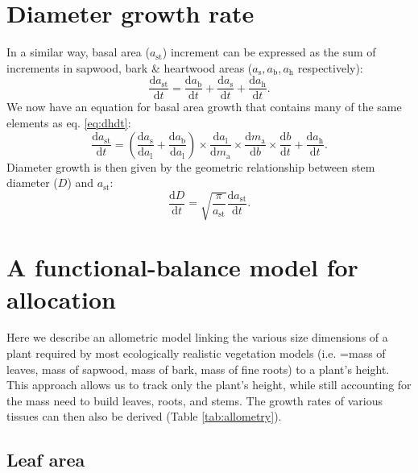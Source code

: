 \documentclass[10pt,twoside]{article}
\begin{document}
\section{Diameter growth rate}

In a similar way, basal area ($a_\textrm{st}$) increment can be
expressed as the sum of increments in sapwood, bark \& heartwood areas
($a_\textrm{s}, a_\textrm{b}, a_\textrm{h}$ respectively):
$$\frac{\textrm{d}a_\textrm{st}}{\textrm{d}t}= \frac{\textrm{d}a_\textrm{b}}{\textrm{d}t} + \frac{\textrm{d}a_\textrm{s}}{\textrm{d}t} + \frac{\textrm{d}a_\textrm{h}}{\textrm{d}t}.$$
We now have an equation for basal area growth that contains many of the same
elements as eq. \ref{eq:dhdt}:
\begin{equation}\label{eq:dast}
\frac{\textrm{d}a_\textrm{st}}{\textrm{d}t}=
\left(\frac{\textrm{d}a_\textrm{s}}{\textrm{d}a_\textrm{l}} + \frac{\textrm{d}a_\textrm{b}}{\textrm{d}a_\textrm{l}}\right) \times
\frac{\textrm{d}a_\textrm{l}}{\textrm{d}m_\textrm{a}} \times \frac{\textrm{d}m_\textrm{a}}{\textrm{d}b} \times \frac{\textrm{d}b}{\textrm{d}t} +\frac{\textrm{d}a_\textrm{h}}{\textrm{d}t} .
\end{equation}
Diameter growth is then given by the geometric relationship between stem
diameter ($D$) and $a_\textrm{st}$:
\begin{equation} \label{eq:dDdt}
\frac{\textrm{d}D}{\textrm{d}t}= \sqrt{\frac{\pi}{a_\textrm{st}}} \frac{\textrm{d}a_\textrm{st}}{\textrm{d}t}.
\end{equation}

\section{A functional-balance model for
allocation}\label{a-functional-balance-model-for-allocation}

Here we describe an allometric model linking the various size dimensions
of a plant required by most ecologically realistic vegetation models
(i.e. =mass of leaves, mass of sapwood, mass of bark, mass of fine
roots) to a plant's height. This approach allows us to track only the
plant's height, while still accounting for the mass need to build
leaves, roots, and stems. The growth rates of various tissues can then
also be derived (Table \ref{tab:allometry}).

\subsection{Leaf area}\label{leaf-area}
\end{document}
